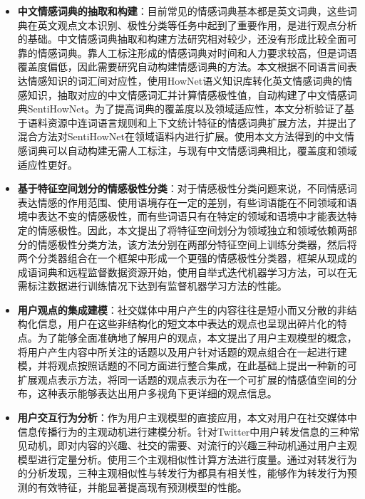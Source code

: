 \begin{cabstract}
\begin{itemize}
\item \textbf{中文情感词典的抽取和构建}：目前常见的情感词典基本都是英文词典，这些词典在英文观点文本识别、极性分类等任务中起到了重要作用，是进行观点分析的基础。中文情感词典抽取和构建方法研究相对较少，还没有形成比较全面可靠的情感词典。靠人工标注形成的情感词典对时间和人力要求较高，但是词语覆盖度偏低，因此需要研究自动构建情感词典的方法。本文根据不同语言间表达情感知识的词汇间对应性，使用HowNet语义知识库转化英文情感词典的情感知识，抽取对应的中文情感词汇并计算情感极性值，自动构建了中文情感词典SentiHowNet。为了提高词典的覆盖度以及领域适应性，本文分析验证了基于语料资源中连词语言规则和上下文统计特征的情感词典扩展方法，并提出了混合方法对SentiHowNet在领域语料内进行扩展。使用本文方法得到的中文情感词典可以自动构建无需人工标注，与现有中文情感词典相比，覆盖度和领域适应性更好。
\item \textbf{基于特征空间划分的情感极性分类}：对于情感极性分类问题来说，不同情感词表达情感的作用范围、使用语境存在一定的差别，有些词语能在不同领域和语境中表达不变的情感极性，而有些词语只有在特定的领域和语境中才能表达特定的情感极性。因此，本文提出了将特征空间划分为领域独立和领域依赖两部分的情感极性分类方法，该方法分别在两部分特征空间上训练分类器，然后将两个分类器组合在一个框架中形成一个更强的情感极性分类器，框架从现成的成语词典和远程监督数据资源开始，使用自举式迭代机器学习方法，可以在无需标注数据进行训练情况下达到有监督机器学习方法的性能。
\item \textbf{用户观点的集成建模}：社交媒体中用户产生的内容往往是短小而又分散的非结构化信息，用户在这些非结构化的短文本中表达的观点也呈现出碎片化的特点。为了能够全面准确地了解用户的观点，本文提出了用户主观模型的概念，将用户产生内容中所关注的话题以及用户针对话题的观点组合在一起进行建模，并将观点按照话题的不同方面进行整合集成，在此基础上提出一种新的可扩展观点表示方法，将同一话题的观点表示为在一个可扩展的情感值空间的分布，这种表示能够表达出用户多视角下更详细的观点信息。
\item \textbf{用户交互行为分析}：作为用户主观模型的直接应用，本文对用户在社交媒体中信息传播行为的主观动机进行建模分析。针对Twitter中用户转发信息的三种常见动机，即对内容的兴趣、社交的需要、对流行的兴趣三种动机通过用户主观模型进行定量分析。使用三个主观相似性计算方法进行度量。通过对转发行为的分析发现，三种主观相似性与转发行为都具有相关性，能够作为转发行为预测的有效特征，并能显著提高现有预测模型的性能。
\end{itemize}


\end{cabstract}
